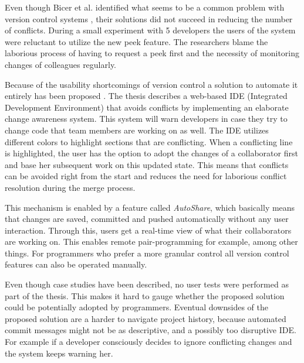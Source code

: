 Even though Bicer et al. identified what seems to be a common problem with version control systems \cite{apel_semistructured_2011,brosch_guiding_2010,guimaraes_improving_2012}, their solutions did not succeed in reducing the number of conflicts. During a small experiment with 5 developers the users of the system were reluctant to utilize the new peek feature. The researchers blame the laborious process of having to request a peek first and the necessity of monitoring changes of colleagues regularly.

\setlength{\parskip}{1em}
\noindent Because of the usability shortcomings of version control a solution to automate it entirely has been proposed \cite{weber_automatic_2012}. The thesis describes a web-based IDE (Integrated Development Environment) that avoids conflicts by implementing an elaborate change awareness system. This system will warn developers in case they try to change code that team members are working on as well. The IDE utilizes different colors to highlight sections that are conflicting. When a conflicting line is highlighted, the user has the option to adopt the changes of a collaborator first and base her subsequent work on this updated state. This means that conflicts can be avoided right from the start and reduces the need for laborious conflict resolution during the merge process.

\setlength{\parskip}{0em}
This mechanism is enabled by a feature called \textit{AutoShare}, which basically means that changes are saved, committed and pushed automatically without any user interaction. Through this, users get a real-time view of what their collaborators are working on. This enables remote pair-programming for example, among other things. For programmers who prefer a more granular control all version control features can also be operated manually.

Even though case studies have been described, no user tests were performed as part of the thesis. This makes it hard to gauge whether the proposed solution could be potentially adopted by programmers. Eventual downsides of the proposed solution are a harder to navigate project history, because automated commit messages might not be as descriptive, and a possibly too disruptive IDE. For example if a developer consciously decides to ignore conflicting changes and the system keeps warning her.%

